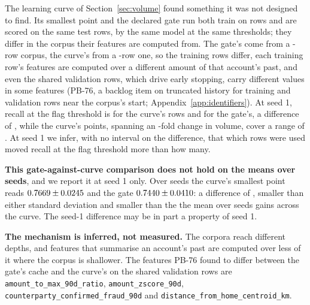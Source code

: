 The learning curve of Section~\ref{sec:volume} found something it was not designed to find. Its
smallest point and the declared gate run both train on \nTrainUsed{} rows and are scored on the same
test rows, by the same model at the same thresholds; they differ in the corpus their features are
computed from. The gate's come from a \nGateCorpus{}-row corpus, the curve's from a
\nLcCorpusSmall{}-row one, so the training rows differ, each training row's features are computed over
a different amount of that account's past, and even the shared validation rows, which drive early
stopping, carry different values in some features (PB-76, a backlog item on truncated history for training and
validation rows near the corpus's start; Appendix~\ref{app:identifiers}). At seed 1, recall at the flag threshold is
\nLcRecallA{} \nLcRecallciA{} for the curve's rows and \nGateRecallSix{} \nGateRecallSixci{} for the
gate's, a difference of \nSelGapSeedOne{}, while the curve's points, spanning an
\nLcVolumeFactor{}-fold change in volume, cover a range of \nLcSpanSeedOne{}. At seed 1 we infer,
with no interval on the difference, that which rows were used moved recall at the flag threshold more
than how many.

\textbf{This gate-against-curve comparison does not hold on the means over seeds}, and we report it
at seed 1 only. Over
\nSeeds{} seeds the curve's smallest point reads $0.7669 \pm 0.0245$ and the gate $0.7440 \pm 0.0410$:
a difference of \nSelGapMeans{}, smaller than either standard deviation and smaller than the
\nLcSeedGain{} the mean over seeds gains across the curve. The seed-1 difference may be in part a
property of seed 1.

\textbf{The mechanism is inferred, not measured.} The corpora reach different depths, and
features that summarise an account's past are computed over less of it where the corpus is
shallower. The features PB-76 found to differ between the gate's cache and the curve's on the shared validation rows
are \texttt{amount\_to\_max\_90d\_ratio}, \texttt{amount\_zscore\_90d},
\texttt{counterparty\_confirmed\_fraud\_90d} and \texttt{distance\_from\_home\_centroid\_km}.

